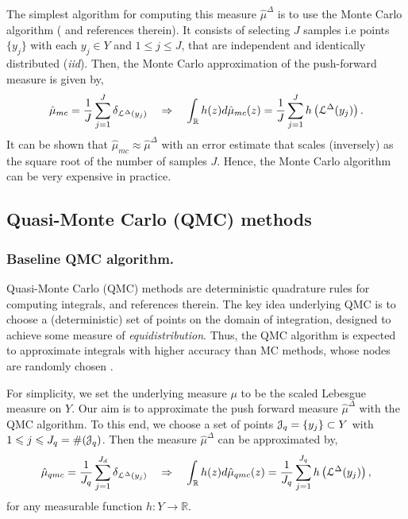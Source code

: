 \documentclass[a4paper]{article}
\numberwithin{equation}{section}
\numberwithin{equation}{section}
\theoremstyle{definition}
\theoremstyle{myremarkstyle}
\renewcommand{\leq}{\leqslant}
\newcommand{\R}{\mathbb{R}}
\newcommand{\map}{\EuScript{L}}
\newcommand{\Jq}{\EuScript{J}_q}
\begin{document}
The simplest algorithm for computing this measure $\hat{\mu}^{\Delta}$ is to use the Monte Carlo algorithm (\cite{CAF1} and references therein). It consists of selecting $J$ samples i.e points $\{ y_j \}$ with each $y_j \in Y$ and $1 \leq j \leq J$, that are independent and identically distributed (\emph{iid}). Then, the Monte Carlo approximation of the push-forward measure is given by, 
\begin{equation}
\label{eq:mc}
\hat{\mu}_{mc} = \frac{1}{J}\sum\limits_{j=1}^{J} \delta_{\map^{\Delta}(y_j)} \quad \Rightarrow \quad \int_{\R} h(z) d\hat{\mu}_{mc}(z) = \frac{1}{J}\sum\limits_{j=1}^{J} h\left(\map^{\Delta}(y_j) \right).
\end{equation}
It can be shown that $\hat{\mu}_{mc} \approx \hat{\mu}^{\Delta}$ with an error estimate that scales (inversely) as the square root of the number of samples $J$. Hence, the Monte Carlo algorithm can be very expensive in practice. 
\subsection{Quasi-Monte Carlo (QMC) methods}
\label{sec:qmc}
\subsubsection{Baseline QMC algorithm.}
Quasi-Monte Carlo (QMC) methods are deterministic quadrature rules for computing integrals, \cite{CAF1} and references therein. The key idea underlying QMC is to choose a (deterministic) set of points on the domain of integration, designed to achieve some measure of \emph{equidistribution}. Thus, the QMC algorithm is expected to approximate integrals with higher accuracy than MC methods, whose nodes are randomly chosen \cite{CAF1}. 

For simplicity, we set the underlying measure $\mu$ to be the scaled Lebesgue measure on $Y$. Our aim is to approximate the push forward measure $\hat{\mu}^{\Delta}$ with the QMC algorithm. To this end, we choose a set of points $\Jq = \{ y_j \} \subset Y$ with $1 \leq j \leq J_q = \#(\Jq)$. Then the measure $\hat{\mu}^{\Delta}$ can be approximated by,
\begin{equation}
\label{eq:m1}
\hat{\mu}_{qmc} = \frac{1}{J_q}\sum\limits_{j=1}^{J_d} \delta_{\map^{\Delta}(y_j)} \quad \Rightarrow \quad \int_{\R} h(z) d\hat{\mu}_{qmc}(z) = \frac{1}{J_q}\sum\limits_{j=1}^{J_q} h\left(\map^{\Delta}(y_j) \right),
\end{equation}
for any measurable function $h:Y \to \R$. 
\end{document}
